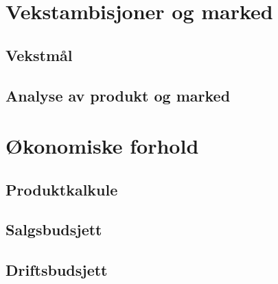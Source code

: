 \section{Vekstambisjoner og marked}


\subsection{Vekstmål}

\subsection{Analyse av produkt og marked}

\section{Økonomiske forhold}

\subsection{Produktkalkule}

\subsection{Salgsbudsjett}

\subsection{Driftsbudsjett}


